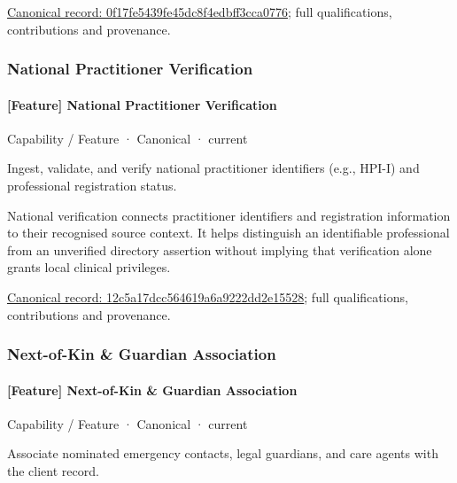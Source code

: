 {\footnotesize \href{../../../../continuum/strategy/capability/feature/0f17fe5439fe45dc8f4edbff3cca0776.md}{Canonical record: 0f17fe5439fe45dc8f4edbff3cca0776}; full qualifications, contributions and provenance.}\par
\subsubsection{National Practitioner Verification}

\paragraph{[Feature] National Practitioner Verification}

\label{element:12c5a17dcc564619a6a9222dd2e15528}
{\small Capability / Feature · Canonical · current}\par

Ingest, validate, and verify national practitioner identifiers (e.g., HPI-I) and professional registration status.



National verification connects practitioner identifiers and registration information to their recognised source context. It helps distinguish an identifiable professional from an unverified directory assertion without implying that verification alone grants local clinical privileges.


{\footnotesize \href{../../../../continuum/strategy/capability/feature/12c5a17dcc564619a6a9222dd2e15528.md}{Canonical record: 12c5a17dcc564619a6a9222dd2e15528}; full qualifications, contributions and provenance.}\par
\subsubsection{Next-of-Kin \& Guardian Association}

\paragraph{[Feature] Next-of-Kin \& Guardian Association}

\label{element:05de74a8a7dc4334ba60543a228e73cb}
{\small Capability / Feature · Canonical · current}\par

Associate nominated emergency contacts, legal guardians, and care agents with the client record.



